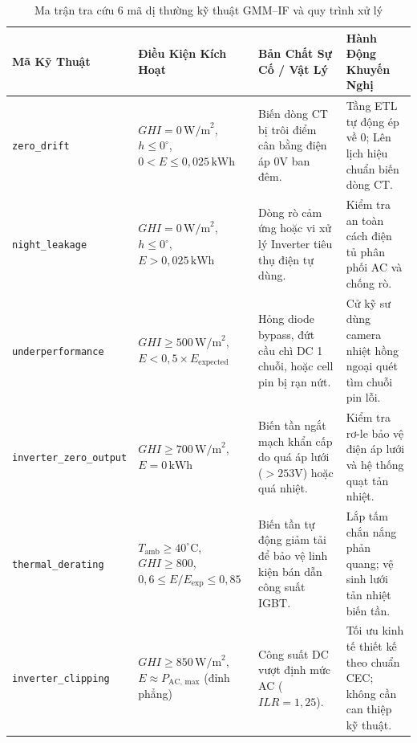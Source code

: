 \documentclass[12pt, a4paper]{report}
\begin{document}
\begin{table}[H]
\centering
\caption{Ma trận tra cứu 6 mã dị thường kỹ thuật GMM--IF và quy trình xử lý}
\label{tab:outlier_matrix_detail}
\footnotesize
\renewcommand{\arraystretch}{1.35}
\begin{tabularx}{\textwidth}{@{} >{\raggedright\arraybackslash}p{2.9cm} >{\raggedright\arraybackslash}p{3.1cm} >{\raggedright\arraybackslash}X >{\raggedright\arraybackslash}X @{}}
\toprule
\textbf{Mã Kỹ Thuật} & \textbf{Điều Kiện Kích Hoạt} & \textbf{Bản Chất Sự Cố / Vật Lý} & \textbf{Hành Động Khuyến Nghị} \\
\midrule
\texttt{zero\_drift} & $GHI = 0\,\text{W/m}^2$, $h \le 0^\circ$,\newline $0 < E \le 0{,}025\,\text{kWh}$ & Biến dòng CT bị trôi điểm cân bằng điện áp 0V ban đêm. & Tầng ETL tự động ép về $0$; Lên lịch hiệu chuẩn biến dòng CT. \\
\midrule
\texttt{night\_leakage} & $GHI = 0\,\text{W/m}^2$, $h \le 0^\circ$,\newline $E > 0{,}025\,\text{kWh}$ & Dòng rò cảm ứng hoặc vi xử lý Inverter tiêu thụ điện tự dùng. & Kiểm tra an toàn cách điện tủ phân phối AC và chống rò. \\
\midrule
\texttt{underperformance} & $GHI \ge 500\,\text{W/m}^2$,\newline $E < 0{,}5 \times E_{\text{expected}}$ & Hỏng diode bypass, đứt cầu chì DC 1 chuỗi, hoặc cell pin bị rạn nứt. & Cử kỹ sư dùng camera nhiệt hồng ngoại quét tìm chuỗi pin lỗi. \\
\midrule
\texttt{inverter\_zero\_}\newline\texttt{output} & $GHI \ge 700\,\text{W/m}^2$,\newline $E = 0\,\text{kWh}$ & Biến tần ngắt mạch khẩn cấp do quá áp lưới ($>253\text{V}$) hoặc quá nhiệt. & Kiểm tra rơ-le bảo vệ điện áp lưới và hệ thống quạt tản nhiệt. \\
\midrule
\texttt{thermal\_}\newline\texttt{derating} & $T_{\text{amb}} \ge 40^\circ\text{C}$, $GHI \ge 800$,\newline $0{,}6 \le E/E_{\text{exp}} \le 0{,}85$ & Biến tần tự động giảm tải để bảo vệ linh kiện bán dẫn công suất IGBT. & Lắp tấm chắn nắng phản quang; vệ sinh lưới tản nhiệt biến tần. \\
\midrule
\texttt{inverter\_}\newline\texttt{clipping} & $GHI \ge 850\,\text{W/m}^2$,\newline $E \approx P_{\text{AC, max}}$ (đỉnh phẳng) & Công suất DC vượt định mức AC ($ILR = 1{,}25$). & Tối ưu kinh tế thiết kế theo chuẩn CEC; không cần can thiệp kỹ thuật. \\
\bottomrule
\end{tabularx}


\end{table}
\end{document}

